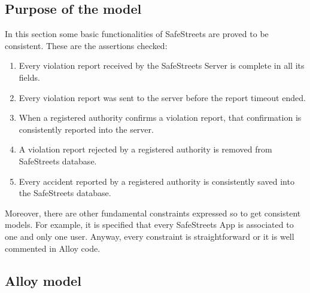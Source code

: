 \documentclass{article}
\begin{document}
		\subsection{Purpose of the model}
		In this section some basic functionalities of SafeStreets are proved to be consistent. These are the assertions checked:
		\begin{enumerate}
			\item Every violation report received by the SafeStreets Server is complete in all its fields.
			\item Every violation report was sent to the server before the report timeout ended.
			\item When a registered authority confirms a violation report, that confirmation is consistently reported into the server.
			\item A violation report rejected by a registered authority is removed from SafeStreets database.
			\item Every accident reported by a registered authority is consistently saved into the SafeStreets database.
		\end{enumerate}
		Moreover, there are other fundamental constraints expressed so to get consistent models. For example, it is specified that every SafeStreets App is associated to one and only one user. Anyway, every constraint is straightforward or it is well commented in Alloy code.
		
		\newpage
		\subsection{Alloy model}
		\vspace{2 mm}
		
		\vspace{8 mm}
		
\end{document}
